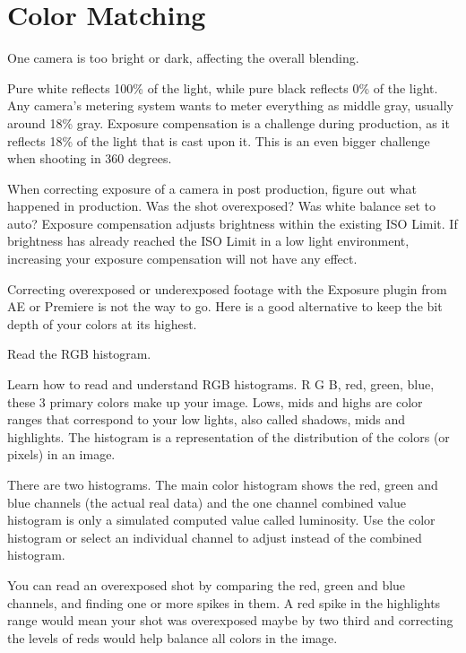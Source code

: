 \chapter{Color Matching}
\pagecolor{white}
\label{chap:32}
\begin{fullwidth}


\problem

{\large One camera is too bright or dark, affecting the overall blending. \par}

Pure white reflects 100\% of the light, while pure black reflects 0\% of the light. Any camera’s metering system wants to meter everything as middle gray, usually around 18\% gray. Exposure compensation is a challenge during production, as it reflects 18\% of the light that is cast upon it. This is an even bigger challenge when shooting in 360 degrees. 

When correcting exposure of a camera in post production, figure out what happened in production. Was the shot overexposed? Was white balance set to auto? Exposure compensation adjusts brightness within the existing ISO Limit. If brightness has already reached the ISO Limit in a low light environment, increasing your exposure compensation will not have any effect.


Correcting overexposed or underexposed footage with the Exposure plugin from AE or Premiere is not the way to go. Here is a good alternative to keep the bit depth of your colors at its highest.

\clearpage
\solution

{\large Read the RGB histogram. \par}


Learn how to read and understand RGB histograms. R G B, red, green, blue, these 3 primary colors make up your image. Lows, mids and highs are color ranges that correspond to your low lights, also called shadows, mids and highlights. The histogram is a representation of the distribution of the colors (or pixels) in an image. 

There are two histograms. The main color histogram shows the red, green and blue channels (the actual real data) and the one channel combined value histogram is only a simulated computed value called luminosity. Use the color histogram or select an individual channel to adjust instead of the combined histogram.

You can read an overexposed shot by comparing the red, green and blue channels, and finding one or more spikes in them. A red spike in the highlights range would mean your shot was overexposed maybe by two third and correcting the levels of reds would help balance all colors in the image.


\end{fullwidth}
